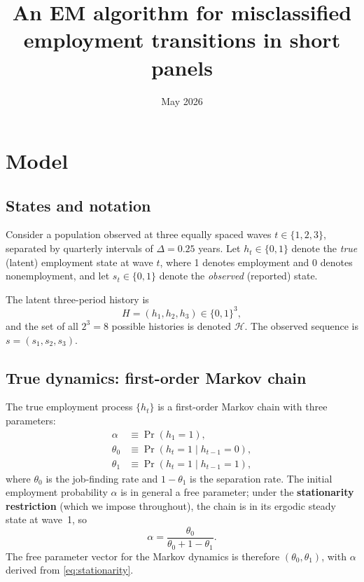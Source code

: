 \documentclass[12pt]{article}
\begin{document}
\title{An EM algorithm for misclassified employment transitions in short panels}
\author{}
\date{May 2026}
\maketitle

\section{Model}

\subsection{States and notation}

Consider a population observed at three equally spaced waves
\(t \in \{1, 2, 3\}\), separated by quarterly intervals of
\(\Delta = 0.25\) years. Let \(h_t \in \{0, 1\}\) denote the
\emph{true} (latent) employment state at wave \(t\), where 1 denotes
employment and 0 denotes nonemployment, and let
\(s_t \in \{0, 1\}\) denote the \emph{observed} (reported) state.

The latent three-period history is
\[
H = (h_1, h_2, h_3) \in \{0, 1\}^3,
\]
and the set of all \(2^3 = 8\) possible histories is denoted
\(\mathcal{H}\). The observed sequence is
\(s = (s_1, s_2, s_3)\).

\subsection{True dynamics: first-order Markov chain}

The true employment process \(\{h_t\}\) is a first-order Markov chain
with three parameters:
\begin{align}
\alpha      &\equiv \Pr(h_1 = 1),                          \label{eq:alpha} \\
\theta_0    &\equiv \Pr(h_t = 1 \mid h_{t-1} = 0),      \label{eq:theta0} \\
\theta_1    &\equiv \Pr(h_t = 1 \mid h_{t-1} = 1),      \label{eq:theta1}
\end{align}
where \(\theta_0\) is the job-finding rate and \(1 - \theta_1\) is the
separation rate. The initial employment probability \(\alpha\) is in
general a free parameter; under the \textbf{stationarity restriction}
(which we impose throughout), the chain is in its ergodic steady state
at wave~1, so
\begin{equation}
\alpha = \frac{\theta_0}{\theta_0 + 1 - \theta_1}.
\label{eq:stationarity}
\end{equation}
The free parameter vector for the Markov dynamics is therefore
\((\theta_0, \theta_1)\), with \(\alpha\) derived from
\eqref{eq:stationarity}.
\end{document}
